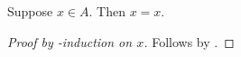 \begin{proposition}\label{phase5_initial_set_induction}
    Suppose $x\in A$.
    Then $x=x$.
\end{proposition}
\begin{proof}[Proof by \in-induction on $x$]
    Follows by \auto.
\end{proof}
